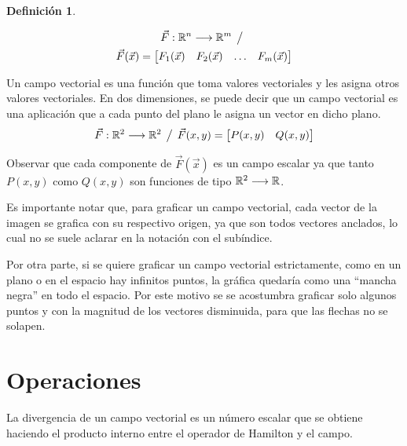 \documentclass[a5paper,12pt,twoside]{book}
\newtheorem{defn}{{Definición}}[chapter]
\begin{document}
\begin{mdframed}[style=MyFrame1]
    \begin{defn}
    \end{defn}
    \begin{multline*}
        \Vec{F}:\mathbb{R}^n \longrightarrow \mathbb{R}^m \hspace{1ex} \big/ \hspace{1ex}
        \\
        \Vec{F}(\Vec{x}) = 
        \begin{bmatrix}
            F_1(\Vec{x}) & F_2(\Vec{x}) & \dots & F_m(\Vec{x})
        \end{bmatrix}
    \end{multline*}
\end{mdframed}

Un campo vectorial es una función que toma valores vectoriales y les asigna otros valores vectoriales. En dos dimensiones, se puede decir que un campo vectorial es una aplicación que a cada punto del plano le asigna un vector en dicho plano.
\begin{equation*}
    \Vec{F}:\mathbb{R}^2 \longrightarrow \mathbb{R}^2 \hspace{1ex} \big/ \hspace{1ex} \Vec{F}(x,y)= 
    \begin{bmatrix}
        P(x,y) & Q(x,y)
    \end{bmatrix}
\end{equation*}

Observar que cada componente de $\Vec{F}(\Vec{x})$ es un campo escalar ya que tanto $P(x,y)$ como $Q(x,y)$ son funciones de tipo $\mathbb{R}^2 \longrightarrow \mathbb{R}$.

Es importante notar que, para graficar un campo vectorial, cada vector de la imagen se grafica con su respectivo origen, ya que son todos vectores anclados, lo cual no se suele aclarar en la notación con el subíndice.

Por otra parte, si se quiere graficar un campo vectorial estrictamente, como en un plano o en el espacio hay infinitos puntos, la gráfica quedaría como una ``mancha negra'' en todo el espacio. Por este motivo se se acostumbra graficar solo algunos puntos y con la magnitud de los vectores disminuida, para que las flechas no se solapen.

\section{Operaciones}

La divergencia de un campo vectorial es un número escalar que se obtiene haciendo el producto interno entre el operador de 
Hamilton y el campo.
\end{document}

